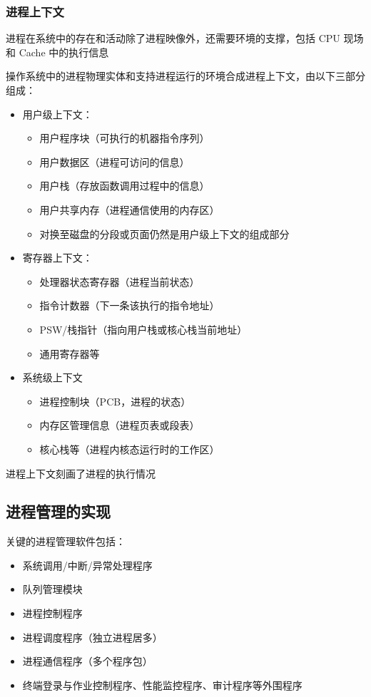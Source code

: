 \documentclass[cs4size,a4paper,10pt]{ctexart}
\begin{document}
	\subsubsection{进程上下文}
	进程在系统中的存在和活动除了进程映像外，还需要环境的支撑，包括 CPU 现场和 Cache 中的执行信息

	操作系统中的进程物理实体和支持进程运行的环境合成进程上下文，由以下三部分组成：
	\begin{itemize}
		\item 用户级上下文：
		\begin{itemize}
			\item 用户程序块（可执行的机器指令序列）
			\item 用户数据区（进程可访问的信息）
			\item 用户栈（存放函数调用过程中的信息）
			\item 用户共享内存（进程通信使用的内存区）
			\item 对换至磁盘的分段或页面仍然是用户级上下文的组成部分
		\end{itemize}
		\item 寄存器上下文：
		\begin{itemize}
			\item 处理器状态寄存器（进程当前状态）
			\item 指令计数器（下一条该执行的指令地址）
			\item PSW/栈指针（指向用户栈或核心栈当前地址）
			\item 通用寄存器等
		\end{itemize}
		\item 系统级上下文
		\begin{itemize}
			\item 进程控制块（PCB，进程的状态）
			\item 内存区管理信息（进程页表或段表）
			\item 核心栈等（进程内核态运行时的工作区）
		\end{itemize}
	\end{itemize}
	进程上下文刻画了进程的执行情况


	\subsection{进程管理的实现}
	关键的进程管理软件包括：
	\begin{itemize}
		\item 系统调用/中断/异常处理程序
		\item 队列管理模块
		\item 进程控制程序
		\item 进程调度程序（独立进程居多）
		\item 进程通信程序（多个程序包）
		\item 终端登录与作业控制程序、性能监控程序、审计程序等外围程序
	\end{itemize}
\end{document}
